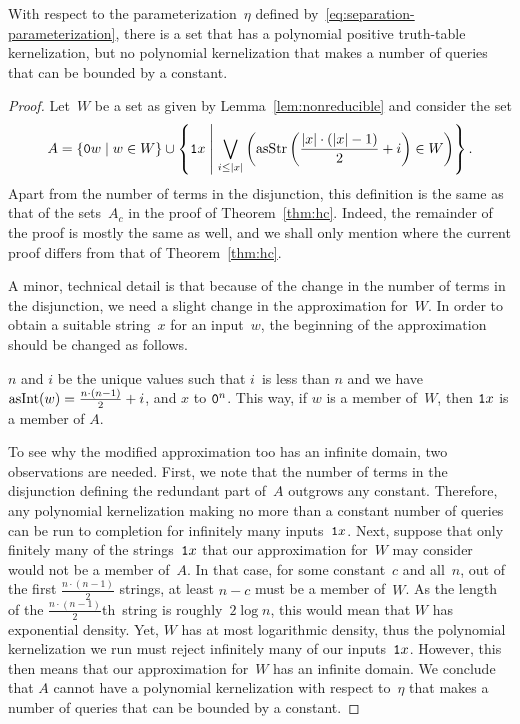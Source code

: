 \begin{theorem}
\label{thm:htt}%
  With respect to the parameterization~$\eta$ defined by~\eqref{eq:separation-parameterization}, there is a set that has a polynomial positive truth-table kernelization, but no polynomial kernelization that makes a number of queries that can be bounded by a constant.
\end{theorem}
\begin{proof}
  Let~$W$ be a set as given by Lemma~\ref{lem:nonreducible} and consider the set
  \begin{equation*}
    A \deq \{\bits{0}w \st w \in W\} \cup \left\{\bits{1}x \st[\middle] \bigvee_{i \le \length{x}} \left(\asStr\left(\frac{\length{x} \cdot (\length{x} - 1)}{2} + i\right) \in W\right)\right\}.
  \end{equation*}
  Apart from the number of terms in the disjunction, this definition is the same as that of the sets~$A_c$ in the proof of Theorem~\ref{thm:hc}.
  Indeed, the remainder of the proof is mostly the same as well, and we shall only mention where the current proof differs from that of Theorem~\ref{thm:hc}.

  A minor, technical detail is that because of the change in the number of terms in the disjunction, we need a slight change in the approximation for~$W$.
  In order to obtain a suitable string~$x$ for an input~$w$, the beginning of the approximation should be changed as follows.
  \begin{codelisting}
  \item
     $n$ and $i$ be the unique values such that $i$~is less than $n$ and we have $\asNat(w) = \frac{n \cdot (n - 1)}{2} + i$, and  $x$ to $\bits{0}^n$.
    This way, if $w$ is a member of~$W$, then $\bits{1}x$ is a member of $A$.
  \end{codelisting}

  To see why the modified approximation too has an infinite domain, two observations are needed.
  First, we note that the number of terms in the disjunction defining the redundant part of~$A$ outgrows any constant.
  Therefore, any polynomial kernelization making no more than a constant number of queries can be run to completion for infinitely many inputs~$\bits{1}x$.
  Next, suppose that only finitely many of the strings~$\bits{1}x$ that our approximation for~$W$ may consider would not be a member of~$A$.
  In that case, for some constant~$c$ and all~$n$, out of the first $\frac{n \cdot (n - 1)}{2}$ strings, at least $n - c$ must be a member of~$W$.
  As the length of the $\frac{n \cdot (n - 1)}{2}$th~string is roughly~$2 \log n$, this would mean that $W$ has exponential density.
  Yet, $W$ has at most logarithmic density, thus the polynomial kernelization we run must reject infinitely many of our inputs~$\bits{1}x$.
  However, this then means that our approximation for~$W$ has an infinite domain.
  We conclude that $A$ cannot have a polynomial kernelization with respect to~$\eta$ that makes a number of queries that can be bounded by a constant.
\end{proof}

